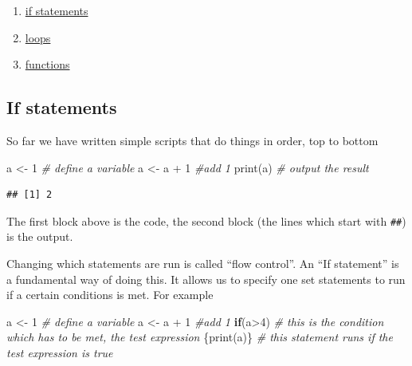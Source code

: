 \documentclass[
  12pt,
  a5paper,
]{book}
\newenvironment{Shaded}{\begin{snugshade}}{\end{snugshade}}
\newcommand{\CommentTok}[1]{\textcolor[rgb]{0.56,0.35,0.01}{\textit{#1}}}
\newcommand{\ControlFlowTok}[1]{\textcolor[rgb]{0.13,0.29,0.53}{\textbf{#1}}}
\newcommand{\DecValTok}[1]{\textcolor[rgb]{0.00,0.00,0.81}{#1}}
\newcommand{\FunctionTok}[1]{\textcolor[rgb]{0.00,0.00,0.00}{#1}}
\newcommand{\NormalTok}[1]{#1}
\newcommand{\OtherTok}[1]{\textcolor[rgb]{0.56,0.35,0.01}{#1}}
\newcommand{\SpecialCharTok}[1]{\textcolor[rgb]{0.00,0.00,0.00}{#1}}
\providecommand{\tightlist}{%
  \setlength{\itemsep}{0pt}\setlength{\parskip}{0pt}}
\begin{document}
\begin{enumerate}
\def\labelenumi{\arabic{enumi}.}
\tightlist
\item
  \protect\hyperlink{if}{if statements}
\item
  \protect\hyperlink{loops}{loops}
\item
  \protect\hyperlink{functions}{functions}
\end{enumerate}

\hypertarget{if}{%
\subsection{If statements}\label{if}}

So far we have written simple scripts that do things in order, top to bottom

\begin{Shaded}
\begin{Highlighting}[]
\NormalTok{a }\OtherTok{\textless{}{-}} \DecValTok{1} \CommentTok{\# define a variable}
\NormalTok{a }\OtherTok{\textless{}{-}}\NormalTok{ a }\SpecialCharTok{+} \DecValTok{1} \CommentTok{\#add 1}
\FunctionTok{print}\NormalTok{(a) }\CommentTok{\# output the result}
\end{Highlighting}
\end{Shaded}

\begin{verbatim}
## [1] 2
\end{verbatim}

The first block above is the code, the second block (the lines which start with \texttt{\#\#}) is the output.

Changing which statements are run is called ``flow control''. An ``If statement'' is a fundamental way of doing this. It allows us to specify one set statements to run if a certain conditions is met. For example

\begin{Shaded}
\begin{Highlighting}[]
\NormalTok{a }\OtherTok{\textless{}{-}} \DecValTok{1} \CommentTok{\# define a variable}
\NormalTok{a }\OtherTok{\textless{}{-}}\NormalTok{ a }\SpecialCharTok{+} \DecValTok{1} \CommentTok{\#add 1}
\ControlFlowTok{if}\NormalTok{(a}\SpecialCharTok{\textgreater{}}\DecValTok{4}\NormalTok{) }\CommentTok{\# this is the condition which has to be met, the \textquotesingle{}test expression\textquotesingle{}}
\NormalTok{  \{}\FunctionTok{print}\NormalTok{(a)\} }\CommentTok{\# this statement runs if the test expression is true}
\end{Highlighting}
\end{Shaded}
\end{document}
